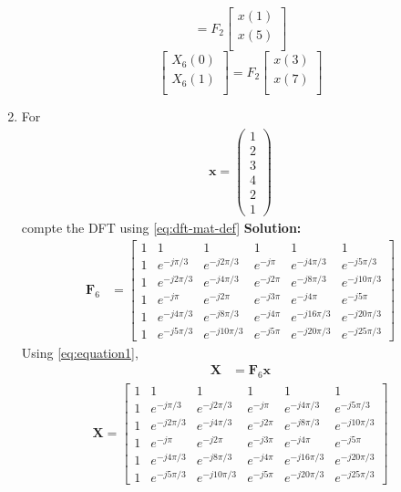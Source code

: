 \documentclass[journal,12pt,twocolumn]{IEEEtran}
\newcommand{\solution}{\noindent \textbf{Solution: }}
\let\vec\mathbf
\numberwithin{equation}{section}
\renewcommand\thesection{\arabic{section}}
\newcommand{\myvec}[1]{\ensuremath{\begin{pmatrix}#1\end{pmatrix}}}
\begin{document}
\begin{enumerate}[label=\arabic*.,ref=\thesection.\theenumi]
\begin{equation}
= F_{2}
\begin{bmatrix}
x(1) \\ 
x(5) \\ 
\end{bmatrix}
\end{equation}
\begin{equation}
\begin{bmatrix}
X_{6}(0) \\ 
X_{6}(1)\\ 
\end{bmatrix}
= F_{2}
\begin{bmatrix}
x(3) \\ 
x(7) \\ 
\end{bmatrix}
\end{equation}
\item For 
    \begin{align}
	    \vec{x} = \myvec{1\\2\\3\\4\\2\\1}
        \label{eq:equation1}
    \end{align}
    compte the DFT  
		using 
	    \eqref{eq:dft-mat-def}
\solution \begin{align}
\vec{F}_6&=\begin{bmatrix}
1&1&1&1&1&1\\1&e^{-j \pi/3 }&e^{-j 2 \pi/3 }&e^{-j \pi }&e^{-j 4 \pi/3 }&e^{-j 5 \pi/3 }\\1&e^{-j 2 \pi/3 }&e^{-j 4 \pi/3 }&e^{-j 2 \pi }&e^{-j 8\pi/3 }&e^{-j 10 \pi/3 }\\1&e^{-j \pi }&e^{-j 2 \pi }&e^{-j 3 \pi }&e^{-j 4 \pi }&e^{-j 5 \pi }\\1&e^{-j 4 \pi/3 }&e^{-j 8 \pi/3 }&e^{-j 4 \pi }&e^{-j 16 \pi/3 }&e^{-j 20 \pi/3 }\\1&e^{-j 5 \pi/3 }&e^{-j 10 \pi/3 }&e^{-j 5 \pi }&e^{-j 20 \pi/3 }&e^{-j 25 \pi/3 }
\end{bmatrix}
\end{align}
Using \eqref{eq:equation1},
\begin{align}
\vec{X}&=\vec{F}_6\vec{x}
\end{align}
\begin{align}
\vec{X}=\begin{bmatrix}
1&1&1&1&1&1\\1&e^{-j \pi/3 }&e^{-j 2 \pi/3 }&e^{-j \pi }&e^{-j 4 \pi/3 }&e^{-j 5 \pi/3 }\\1&e^{-j 2 \pi/3 }&e^{-j 4 \pi/3 }&e^{-j 2 \pi }&e^{-j 8\pi/3 }&e^{-j 10 \pi/3 }\\1&e^{-j \pi }&e^{-j 2 \pi }&e^{-j 3 \pi }&e^{-j 4 \pi }&e^{-j 5 \pi }\\1&e^{-j 4 \pi/3 }&e^{-j 8 \pi/3 }&e^{-j 4 \pi }&e^{-j 16 \pi/3 }&e^{-j 20 \pi/3 }\\1&e^{-j 5 \pi/3 }&e^{-j 10 \pi/3 }&e^{-j 5 \pi }&e^{-j 20 \pi/3 }&e^{-j 25 \pi/3 }

\end{bmatrix}
\end{align}
\end{enumerate}
\end{document}
